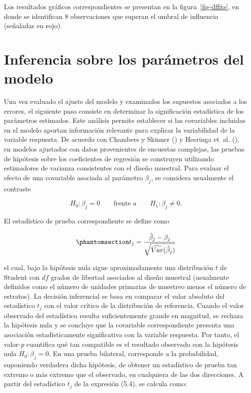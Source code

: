 \documentclass[
  spanish,
  11pt,
  letterpaper,
  oneside,
  open=any]{scrbook}
\begin{document}
Los resultados gráficos correspondientes se presentan en la
figura~\ref{fig-dffits}, en donde se identifican 8 observaciones que
superan el umbral de influencia (señaladas en rojo).

\section{Inferencia sobre los parámetros del
modelo}\label{inferencia-sobre-los-parametros-del-modelo}

Una vez evaluado el ajuste del modelo y examinados los supuestos
asociados a los errores, el siguiente paso consiste en determinar la
significación estadística de los parámetros estimados. Este análisis
permite establecer si las covariables incluidas en el modelo aportan
información relevante para explicar la variabilidad de la variable
respuesta. De acuerdo con Chambers y Skinner
() y Heeringa et~al.
(), en modelos ajustados
con datos provenientes de encuestas complejas, las pruebas de hipótesis
sobre los coeficientes de regresión se construyen utilizando estimadores
de varianza consistentes con el diseño muestral. Para evaluar el efecto
de una covariable asociada al parámetro \(\beta_j\), se considera
usualmente el contraste

\[
H_0:\beta_j=0
\qquad \text{frente a} \qquad
H_1:\beta_j\neq 0.
\]

El estadístico de prueba correspondiente se define como

\begin{equation}\protect\phantomsection\label{eq-prueba-coeficiente-regresion}{
t_j=
\frac{\hat{\beta}_{j}-\beta_{j}}
{\sqrt{\widehat{Var}(\hat{\beta}_{j})}}
}\end{equation}

el cual, bajo la hipótesis nula sigue aproximadamente una distribución
\(t\) de Student con \(df\) grados de libertad asociados al diseño
muestral (usualmente definidos como el número de unidades primarias de
muestreo menos el número de estratos). La decisión inferencial se basa
en comparar el valor absoluto del estadístico \(t_j\) con el valor
crítico de la distribución de referencia. Cuando el valor observado del
estadístico resulta suficientemente grande en magnitud, se rechaza la
hipótesis nula y se concluye que la covariable correspondiente presenta
una asociación estadísticamente significativa con la variable respuesta.
Por tanto, el valor-\emph{p} cuantifica qué tan compatible es el
resultado observado con la hipótesis nula \(H_0:\beta_j=0\). En una
prueba bilateral, corresponde a la probabilidad, suponiendo verdadera
dicha hipótesis, de obtener un estadístico de prueba tan extremo o más
extremo que el observado, en cualquiera de las dos direcciones. A partir
del estadístico \(t_j\) de la expresión (5.4), se calcula como:
\end{document}
